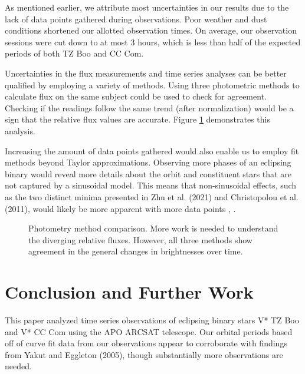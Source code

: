 \documentclass[12pt]{article}
\begin{document}
As mentioned earlier, we attribute most uncertainties in our results due to the lack of data points gathered during observations. Poor weather and dust conditions shortened our allotted observation times. On average, our observation sessions were cut down to at most 3 hours, which is less than half of the expected periods of both TZ Boo and CC Com. 

Uncertainties in the flux measurements and time series analyses can be better qualified by employing a variety of methods. Using three photometric methods to calculate flux on the same subject could be used to check for agreement. Checking if the readings follow the same trend (after normalization) would be a sign that the relative flux values are accurate. Figure \ref{fig:flux-comp} demonstrates this analysis.

Increasing the amount of data points gathered would also enable us to employ fit methods beyond Taylor approximations. Observing more phases of an eclipsing binary would reveal more details about the orbit and constituent stars that are not captured by a sinusoidal model. This means that non-sinusoidal effects, such as the two distinct minima presented in Zhu et al. (2021) and Christopolou et al. (2011), would likely be more apparent with more data points \cite{2011AJ....142...99C}, \cite{2021RAA....21...84Z}.

\begin{figure}[htpb]
    \begin{center}
        
    \end{center}
    \caption{}
\end{figure}
\begin{figure}[htpb]
    \begin{center}
        
    \end{center}
    \label{fig:flux-comp}
    \caption{Photometry method comparison. More work is needed to understand the diverging relative fluxes. However, all three methods show agreement in the general changes in brightnesses over time.}
\end{figure}
\section{Conclusion and Further Work}

This paper analyzed time series observations of eclipsing binary stars V* TZ Boo and V* CC Com using the APO ARCSAT telescope. Our orbital periods based off of curve fit data from our observations appear to corroborate with findings from Yakut and Eggleton (2005), though substantially more observations are needed.
\end{document}
